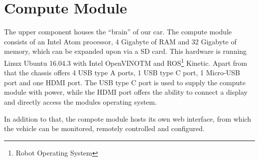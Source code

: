 \section{Compute Module}
The upper component houses the ``brain'' of our car. The compute module consists of an Intel Atom
processor, 4 Gigabyte of RAM and 32 Gigabyte of memory, which can be expanded upon via a SD card. This hardware is running Linux Ubuntu 16.04.3 with Intel OpenVINO\textsc{T}\textsc{M} and ROS\footnote{Robot Operating System} Kinetic. Apart from that the chassis offers 4 USB type A ports, 1 USB type C port, 1 Micro-USB port and one HDMI port. The USB type C port is used to supply the compute module with power, while the HDMI port offers the ability to connect a display and directly access the modules operating system.

In addition to that, the compote module hosts its own web interface, from which the vehicle can be monitored, remotely controlled and configured.

